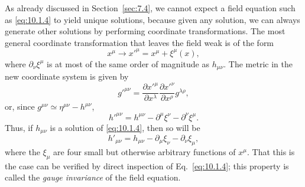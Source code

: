 As already discussed in Section~\ref{sec:7.4}, we cannot expect a field
equation such as \eqref{eq:10.1.4} to yield unique solutions, because given
any solution, we can always generate other solutions by performing coordinate
transformations. The most general coordinate transformation that leaves the
field weak is of the form
\begin{equation}
  x^\mu\longrightarrow x'^\mu=x^\mu+\xi^\mu(x),
  \tag{10.1.7}\label{eq:10.1.7}
\end{equation}
where \(\partial_\nu\xi^\mu\) is at most of the same order of magnitude as
\(h_{\mu\nu}\). The metric in the new coordinate system is given by
\[
  g'^{\mu\nu}
  =
  \frac{\partial x'^\mu}{\partial x^\lambda}
  \frac{\partial x'^\nu}{\partial x^\rho}g^{\lambda\rho},
\]
or, since \(g^{\mu\nu}\simeq\eta^{\mu\nu}-h^{\mu\nu}\),
\[
  h'^{\mu\nu}
  =
  h^{\mu\nu}-\partial^\mu\xi^\nu-\partial^\nu\xi^\mu.
\]
Thus, if \(h_{\mu\nu}\) is a solution of \eqref{eq:10.1.4}, then so will be
\begin{equation}
  h'_{\mu\nu}
  =
  h_{\mu\nu}-\partial_\mu\xi_\nu-\partial_\nu\xi_\mu,
  \tag{10.1.8}\label{eq:10.1.8}
\end{equation}
where the \(\xi_\mu\) are four small but otherwise arbitrary functions of
\(x^\mu\). That this is the case can be verified by direct inspection of
Eq.~\eqref{eq:10.1.4}; this property is called the \emph{gauge invariance} of
the field equation.


